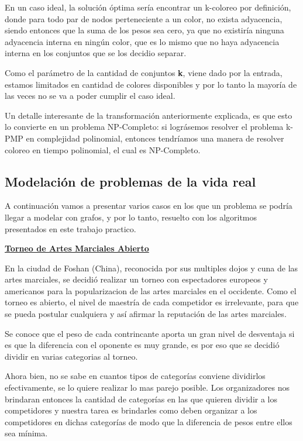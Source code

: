 En un caso ideal, la solución óptima sería encontrar un k-coloreo por definición, donde para todo par de nodos perteneciente a un color, no exista adyacencia, siendo entonces que la suma de los pesos sea cero, ya que no existiría ninguna adyacencia interna en ningún color, que es lo mismo que no haya adyacencia interna en los conjuntos que se los decidio separar.

Como el parámetro de la cantidad de conjuntos \textbf{k}, viene dado por la entrada, estamos limitados en cantidad de colores disponibles y por lo tanto la mayoría de las veces no se va a poder cumplir el caso ideal. 

Un detalle interesante de la transformación anteriormente explicada, es que esto lo convierte en un problema NP-Completo: si lográsemos resolver el problema k-PMP en complejidad polinomial, entonces tendríamos una manera de resolver coloreo en tiempo polinomial, el cual es NP-Completo.

\newpage
\subsection{Modelación de problemas de la vida real}
A continuación vamos a presentar varios casos en los que un problema se podría llegar a modelar con grafos, y por lo tanto, resuelto con los algoritmos presentados en este trabajo practico.

\bigskip
\noindent \underline{\textbf{Torneo de Artes Marciales Abierto}}

En la ciudad de Foshan (China), reconocida por sus multiples dojos y cuna de las artes marciales, se decidió realizar un torneo con espectadores europeos y americanos para la popularizacion de las artes marciales en el occidente. Como el torneo es abierto, el nivel de maestría de cada competidor es irrelevante, para que se pueda postular cualquiera y así afirmar la reputación de las artes marciales. 

Se conoce que el peso de cada contrincante aporta un gran nivel de desventaja si es que la diferencia con el oponente es muy grande, es por eso que se decidió dividir en varias categorias al torneo.

Ahora bien, no se sabe en cuantos tipos de categorías conviene dividirlos efectivamente, se lo quiere realizar lo mas parejo posible. Los organizadores nos brindaran entonces la cantidad de categorías en las que quieren dividir a los competidores y nuestra tarea es brindarles como deben organizar a los competidores en dichas categorías de modo que la diferencia de pesos entre ellos sea mínima.


